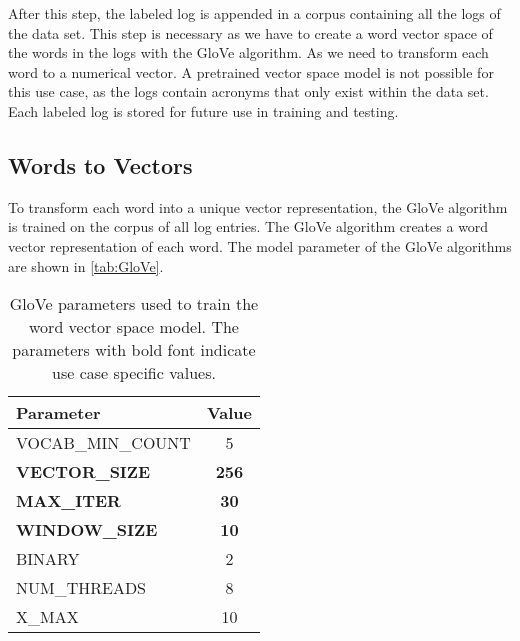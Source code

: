 After this step, the labeled log is appended in a corpus containing all the logs of the data set. This step is necessary as we have to create a word vector space of the words in the logs with the GloVe algorithm. As we need to transform each word to a numerical vector. A pretrained vector space model is not possible for this use case, as the logs contain acronyms that only exist within the data set. Each labeled log is stored for future use in training and testing.

\subsection{Words to Vectors}
To transform each word into a unique vector representation, the GloVe algorithm is trained on the corpus of all log entries. The GloVe algorithm creates a word vector representation of each word. The model parameter of the GloVe algorithms are shown in \autoref{tab:GloVe}.


\begin{table}[H]
\centering
\caption{GloVe parameters used to train the word vector space model. The parameters with bold font indicate use case specific values.}
\label{tab:GloVe}
\begin{tabularx}{10cm}{p{7cm} c}
\toprule
Parameter & Value\\
\midrule
        VOCAB\_MIN\_COUNT & 5\\
        \textbf{VECTOR\_SIZE} & \textbf{256}\\
        \textbf{MAX\_ITER} & \textbf{30}\\
        \textbf{WINDOW\_SIZE} & \textbf{10}\\
        BINARY & 2\\
        NUM\_THREADS & 8\\
        X\_MAX & 10\\
\bottomrule
\end{tabularx}
\end{table}


